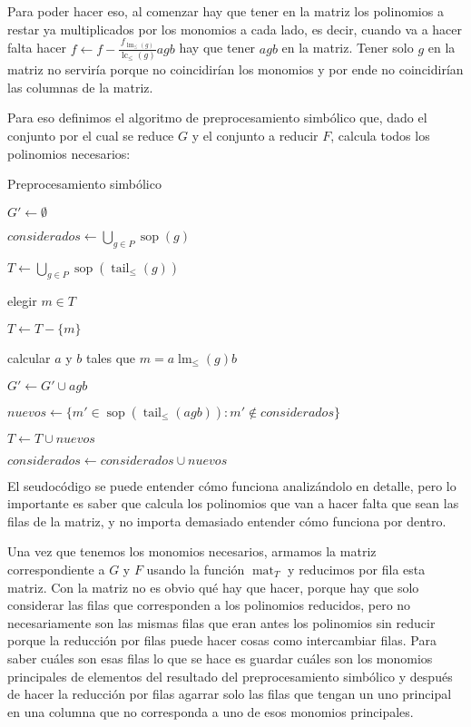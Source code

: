 \documentclass[12pt]{report}
\theoremstyle{customstyle}
\theoremstyle{factstyle}
\DeclareMathOperator{\sop}{sop}
\DeclareMathOperator{\lm}{lm}
\DeclareMathOperator{\lc}{lc}
\DeclareMathOperator{\tail}{tail}
\DeclareMathOperator{\mat}{mat}
\begin{document}
Para poder hacer eso, al comenzar hay que tener en la matriz los polinomios a restar ya multiplicados por los monomios a cada lado, es decir, cuando va a hacer falta hacer $f ← f - \frac{f_{\lm_≤(g)}}{\lc_≤(g)}a g b$ hay que tener $agb$ en la matriz. Tener solo $g$ en la matriz no serviría porque no coincidirían los monomios y por ende no coincidirían las columnas de la matriz.

Para eso definimos el algoritmo de preprocesamiento simbólico que, dado el conjunto por el cual se reduce $G$ y el conjunto a reducir $F$, calcula todos los polinomios necesarios:

\begin{algorithm}[H] %
  \caption{Preprocesamiento simbólico}\label{alg:Preprocesamiento simbólico}
  $G' ← ∅$

  $considerados ← ⋃_{g ∈ P} \sop(g)$

  $T ← ⋃_{g ∈ P} \sop(\tail_≤(g))$

   {
    elegir $m ∈ T$

    $T ← T - \{m\}$

     {
      \If{$\lm_≤(g) | m$} {
        calcular $a$ y $b$ tales que $m = a \lm_≤(g) b$

        $G' ← G' ∪ {agb}$

        $nuevos ← \{m' ∈ \sop(\tail_≤(agb)) : m' ∉ considerados\}$

        $T ← T ∪ nuevos$

        $considerados ← considerados ∪ nuevos$
      }
    }
  }

\end{algorithm}

El seudocódigo se puede entender cómo funciona analizándolo en detalle, pero lo importante es saber que calcula los polinomios que van a hacer falta que sean las filas de la matriz, y no importa demasiado entender cómo funciona por dentro.

Una vez que tenemos los monomios necesarios, armamos la matriz correspondiente a $G$ y $F$ usando la función $\mat_T$ y reducimos por fila esta matriz. Con la matriz no es obvio qué hay que hacer, porque hay que solo considerar las filas que corresponden a los polinomios reducidos, pero no necesariamente son las mismas filas que eran antes los polinomios sin reducir porque la reducción por filas puede hacer cosas como intercambiar filas. Para saber cuáles son esas filas lo que se hace es guardar cuáles son los monomios principales de elementos del resultado del preprocesamiento simbólico y después de hacer la reducción por filas agarrar solo las filas que tengan un uno principal en una columna que no corresponda a uno de esos monomios principales.
\end{document}
